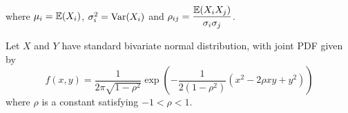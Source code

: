 where $\mu_i = \mathbb{E}(X_i)$, $\sigma_i^2 = \text{Var}(X_i)$ and $\rho_{ij} = \displaystyle\frac{\mathbb{E}(X_iX_j)}{\sigma_i\sigma_j}$.


\begin{exercise}
\begin{questions}
\question
Let $X$ and $Y$ have standard bivariate normal distribution, with joint PDF given by
\[
f(x,y) = \frac{1}{2\pi\sqrt{1-\rho^2}}\exp\left(-\frac{1}{2(1-\rho^2)}(x^2 - 2\rho xy + y^2)\right)
\]
where $\rho$ is a constant satisfying $-1 < \rho < 1$. 
\end{questions}
\end{exercise}
